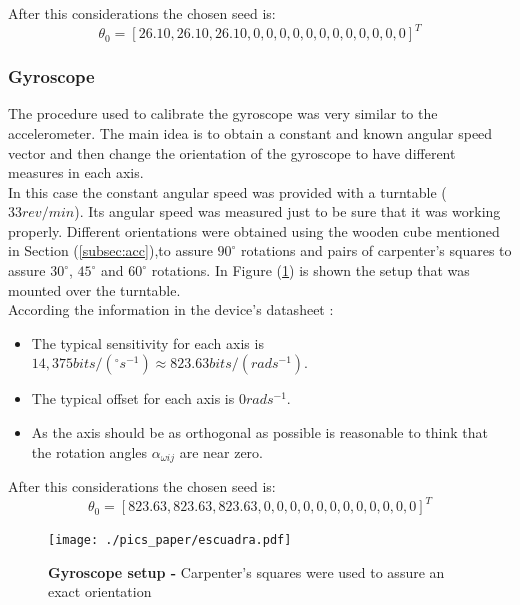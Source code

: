 \documentclass[conference]{IEEEtran}
\newcommand{\refp}[1]{(\ref{#1})}
\begin{document}
After this considerations the chosen seed is:
\begin{equation}
{\theta}_0 = [26.10, 26.10, 26.10, 0, 0, 0, 0, 0, 0, 0, 0, 0, 0, 0, 0]^T
\end{equation}
\subsubsection{Gyroscope}

The procedure used to calibrate the gyroscope was very similar to the accelerometer. The main idea is to obtain a constant and known angular speed vector and then change the orientation of the gyroscope to have different measures in each axis.\\

In this case the constant angular speed was provided with a turntable ($33 rev/min$). Its angular speed was measured just to be sure that it was working properly. Different orientations were obtained using the wooden cube mentioned in Section \refp{subsec:acc},to assure $90^\circ$ rotations and pairs of carpenter's squares to assure $30^\circ$, $45^\circ$ and $60^\circ$ rotations. In Figure \refp{fig:setup_gyro} is shown the setup that was mounted over the turntable.\\

According the information in the device's datasheet \cite{bib:gyro_data}:

\begin{itemize}
\item The typical sensitivity for each axis is $14,375 bits/(^\circ s^{-1})\approx 823.63 bits/(rad s^{-1})$.
\item The typical offset for each axis is $0 rad s^{-1}$.
\item As the axis should be as orthogonal as possible is reasonable to think that the rotation angles $\alpha_{\omega ij}$ are near zero. 
\end{itemize}

After this considerations the chosen seed is:
\begin{equation}
{\theta}_0 = [823.63, 823.63, 823.63, 0, 0, 0, 0, 0, 0, 0, 0, 0, 0, 0, 0]^T
\end{equation}

\begin{figure}
	\centering
	\texttt{[image: ./pics\_paper/escuadra.pdf]}
	\caption{\textbf{Gyroscope setup - }Carpenter's squares were used to assure an exact orientation}
	\label{fig:setup_gyro}
\end{figure}
\end{document}
